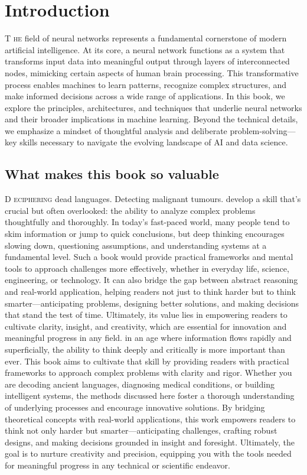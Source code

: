 \documentclass{book}
\begin{document}
\section{Introduction}
\lettrine{T}{ he} field of neural networks represents a fundamental cornerstone of modern artificial intelligence. At its core, a neural network functions as a system that transforms input data into meaningful output through layers of interconnected nodes, mimicking certain aspects of human brain processing. This transformative process enables machines to learn patterns, recognize complex structures, and make informed decisions across a wide range of applications.
In this book, we explore the principles, architectures, and techniques that underlie neural networks and their broader implications in machine learning. Beyond the technical details, we emphasize a mindset of thoughtful analysis and deliberate problem-solving—key skills necessary to navigate the evolving landscape of AI and data science.

\subsection{What makes this book so valuable}
\lettrine{D}{ eciphering} dead languages. Detecting malignant tumours. develop a skill that’s crucial but often overlooked: the ability to analyze complex problems thoughtfully and thoroughly. In today’s fast-paced world, many people tend to skim information or jump to quick conclusions, but deep thinking encourages slowing down, questioning assumptions, and understanding systems at a fundamental level. Such a book would provide practical frameworks and mental tools to approach challenges more effectively, whether in everyday life, science, engineering, or technology. It can also bridge the gap between abstract reasoning and real-world application, helping readers not just to think harder but to think smarter—anticipating problems, designing better solutions, and making decisions that stand the test of time. Ultimately, its value lies in empowering readers to cultivate clarity, insight, and creativity, which are essential for innovation and meaningful progress in any field.
in an age where information flows rapidly and superficially, the ability to think deeply and critically is more important than ever. This book aims to cultivate that skill by providing readers with practical frameworks to approach complex problems with clarity and rigor. Whether you are decoding ancient languages, diagnosing medical conditions, or building intelligent systems, the methods discussed here foster a thorough understanding of underlying processes and encourage innovative solutions.
By bridging theoretical concepts with real-world applications, this work empowers readers to think not only harder but smarter—anticipating challenges, crafting robust designs, and making decisions grounded in insight and foresight. Ultimately, the goal is to nurture creativity and precision, equipping you with the tools needed for meaningful progress in any technical or scientific endeavor.
\end{document}
